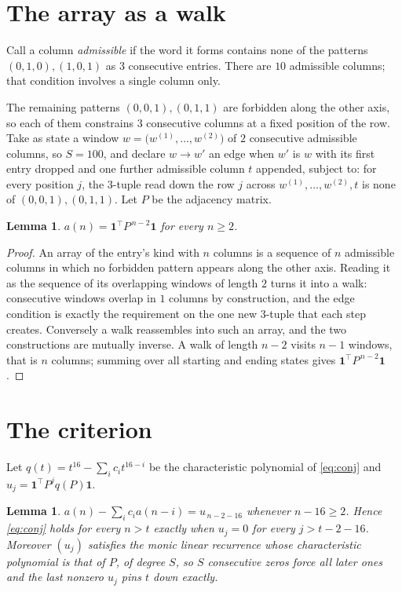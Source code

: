 \documentclass[11pt,a4paper]{article}
\theoremstyle{plain}
\newtheorem{lemma}[theorem]{Lemma}
\theoremstyle{definition}
\begin{document}
\section{The array as a walk}

Call a column \emph{admissible} if the word it forms contains none of the patterns
$(0,1,0), (1,0,1)$ as $3$ consecutive entries. There are $10$ admissible columns; that condition
involves a single column only.

The remaining patterns $(0,0,1), (0,1,1)$ are forbidden along the other axis, so each of them
constrains $3$ consecutive columns at a fixed position of the row. Take as state a
window $w=\bigl(w^{(1)},\dots,w^{(2)}\bigr)$ of $2$ consecutive admissible
columns, so $S=100$, and declare $w\to w'$ an edge when $w'$ is $w$ with its first entry
dropped and one further admissible column $t$ appended, subject to: for every position
$j$, the $3$-tuple read down the row $j$ across $w^{(1)},\dots,w^{(2)},t$
is none of $(0,0,1), (0,1,1)$. Let $P$ be the adjacency matrix.

\begin{lemma}\label{lem:walk}
$a(n)=\mathbf{1}^{\!\top}P^{\,n-2}\mathbf{1}$ for every $n\ge2$.
\end{lemma}

\begin{proof}
An array of the entry's kind with $n$ columns is a sequence of $n$ admissible columns in
which no forbidden pattern appears along the other axis. Reading it as the sequence of its
overlapping windows of length $2$ turns it into a walk: consecutive windows overlap in
$1$ columns by construction, and the edge condition is exactly the requirement on the one
new $3$-tuple that each step creates. Conversely a walk reassembles into such an array,
and the two constructions are mutually inverse. A walk of length $n-2$ visits $n-1$
windows, that is $n$ columns; summing over all starting and ending states gives
$\mathbf{1}^{\!\top}P^{\,n-2}\mathbf{1}$.
\end{proof}

\section{The criterion}

Let $q(t)=t^{16}-\sum_i c_i t^{16-i}$ be the characteristic polynomial of
\eqref{eq:conj} and $u_j=\mathbf{1}^{\!\top}P^{j}q(P)\mathbf{1}$.

\begin{lemma}\label{lem:crit}
$a(n)-\sum_i c_i a(n-i)=u_{\,n-2-16}$ whenever $n-16\ge2$. Hence
\eqref{eq:conj} holds for every $n>t$ exactly when $u_j=0$ for every
$j>t-2-16$. Moreover $(u_j)$ satisfies the monic linear recurrence whose
characteristic polynomial is that of $P$, of degree $S$, so $S$ consecutive zeros force all
later ones and the last nonzero $u_j$ pins $t$ down exactly.
\end{lemma}
\end{document}
